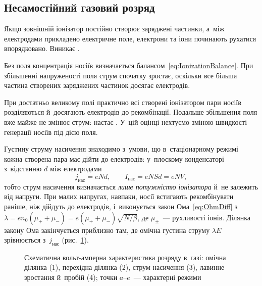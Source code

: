 \subsection*{Несамостійний газовий розряд}


Якщо зовнішній іонізатор постійно створює заряджені частинки, а~між електродами прикладено
електричне поле, електрони та іони починають рухатися впорядковано. Виникає
.

Без поля концентрація носіїв визначається балансом~\eqref{eq:IonizationBalance}. При
збільшенні напруженості поля струм спочатку зростає, оскільки все більша частина створених
заряджених частинок досягає електродів.

При достатньо великому полі практично всі створені іонізатором пари носіїв розділяються
й~досягають електродів до рекомбінації. Подальше збільшення поля вже майже не змінює
струм: настає . У~цій оцінці нехтуємо зміною швидкості генерації
носіїв під дією поля.



Густину струму насичення знаходимо з~умови, що в~стаціонарному режимі кожна створена пара
має дійти до електродів: у~плоскому конденсаторі з~відстанню $d$ між електродами
\begin{equation}\label{eq:SaturationCurrentDensity}
	j_{\text{нас}} = eNd, \qquad I_{\text{нас}} = eNSd = eNV,
\end{equation}
тобто струм насичення визначається \emph{лише потужністю іонізатора} й~не залежить від
напруги. При малих напругах, навпаки, носії встигають рекомбінувати раніше, ніж дійдуть до
електродів, і~виконується закон Ома~\eqref{eq:OhmDiff} з
$\lambda=en_0(\mu_++\mu_-)=e(\mu_++\mu_-)\sqrt{N/\beta}$, де $\mu_\pm$~--- рухливості
іонів. Ділянка закону Ома закінчується приблизно там, де омічна густина струму $\lambda E$
зрівнюється з~$j_{\text{нас}}$ (рис.~\ref{pic:GasIV}).

\begin{figure}[h!]\centering
	\caption{Схематична вольт-амперна характеристика розряду в~газі: омічна ділянка (1),
	перехідна ділянка (2), струм насичення (3), лавинне зростання й~пробій (4); точки
	$a$--$e$~--- характерні режими\label{pic:GasIV}}
\end{figure}

